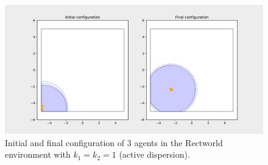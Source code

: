 \begin{figure}[H]
  \centering
  \includegraphics[width=\textwidth]{figs/bigworld_3_agnt_k_1_1_k_2_1_distr.pdf}
  \caption{Initial and final configuration of 3 agents in the Rectworld environment with $k_{1} = k_{2} = 1$ (active dispersion).}
  \label{fig:3_agnt_bw_k_1_1_k_2_1_distr}
\end{figure}
